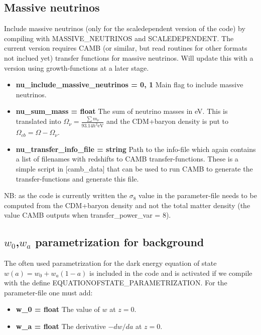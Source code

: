 \documentclass[usenatbib]{article}
\begin{document}
\subsection*{Massive neutrinos}

Include massive neutrinos (only for the scaledependent version of the code) by compiling with MASSIVE\_NEUTRINOS and SCALEDEPENDENT. The current version requires CAMB (or similar, but read routines for other formats not inclued yet) transfer functions for massive neutrinos. Will update this with a version using growth-functions at a later stage.

\begin{itemize}

\item \textbf{nu\_include\_massive\_neutrinos = 0, 1} Main flag to include massive neutrinos.

\item \textbf{nu\_sum\_mass = float} The sum of neutrino masses in eV. This is translated into $\Omega_\nu = \frac{\sum m_\nu}{93.14 h^2 \text{eV}}$ and the CDM+baryon density is put to $\Omega_{cb} = \Omega - \Omega_\nu$.

\item \textbf{nu\_transfer\_info\_file = string} Path to the info-file which again contains a list of filenames with redshifts to CAMB transfer-functions. These is a simple script in [camb\_data] that can be used to run CAMB to generate the transfer-functions and generate this file.

\end{itemize}

NB: as the code is currently written the $\sigma_8$ value in the parameter-file needs to be computed from the CDM+baryon density and not the total matter density (the value CAMB outputs when transfer\_power\_var = 8).

\subsection*{$w_0$,$w_a$ parametrization for background}

The often used parametrization for the dark energy equation of state $w(a) = w_0 + w_a(1-a)$ is included in the code and is activated if we compile with the define EQUATIONOFSTATE\_PARAMETRIZATION. For the parameter-file one must add:

\begin{itemize}

\item \textbf{w\_0 = float} The value of $w$ at $z=0$.
\item \textbf{w\_a = float} The derivative $-dw/da$ at $z=0$.

\end{itemize}
\end{document}
